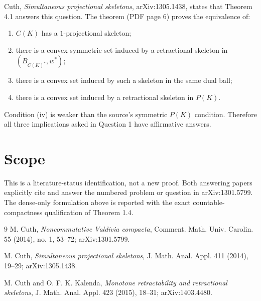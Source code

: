 \documentclass[11pt]{article}
\begin{document}
Cuth, \emph{Simultaneous projectional skeletons}, arXiv:1305.1438, states
that Theorem 4.1 answers this question.  The theorem (PDF page 6) proves the
equivalence of:
\begin{enumerate}[label=(\roman*)]
  \item $C(K)$ has a $1$-projectional skeleton;
  \item there is a convex symmetric set induced by a retractional skeleton in
        $(B_{C(K)^*},w^*)$;
  \item there is a convex set induced by such a skeleton in the same dual ball;
  \item there is a convex set induced by a retractional skeleton in $P(K)$.
\end{enumerate}
Condition (iv) is weaker than the source's symmetric $P(K)$ condition.
Therefore all three implications asked in Question 1 have affirmative
answers.

\section*{Scope}

This is a literature-status identification, not a new proof.  Both answering
papers explicitly cite and answer the numbered problem or question in
arXiv:1301.5799.  The dense-only formulation above is reported with the exact
countable-compactness qualification of Theorem 1.4.

\begin{thebibliography}{9}
M. Cuth,
\emph{Noncommutative Valdivia compacta},
Comment. Math. Univ. Carolin. 55 (2014), no. 1, 53--72;
arXiv:1301.5799.

M. Cuth,
\emph{Simultaneous projectional skeletons},
J. Math. Anal. Appl. 411 (2014), 19--29;
arXiv:1305.1438.

M. Cuth and O. F. K. Kalenda,
\emph{Monotone retractability and retractional skeletons},
J. Math. Anal. Appl. 423 (2015), 18--31;
arXiv:1403.4480.
\end{thebibliography}
\end{document}
